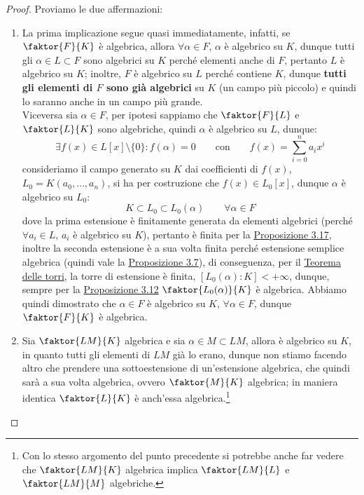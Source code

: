 \documentclass[11pt]{scrartcl}
\begin{document}
\begin{proof}
    Proviamo le due affermazioni:
    \begin{enumerate}[(1)]
        \item La prima implicazione segue quasi immediatamente, infatti, se $\faktor{F}{K}$ è algebrica, allora $\forall \alpha \in F$, $\alpha$ è algebrico su $K$,
            dunque tutti gli $\alpha \in L \subset F$ sono algebrici su $K$ perché elementi anche di $F$, pertanto $L$ è algebrico su $K$; inoltre, $F$ è algebrico su $L$ perché
            contiene $K$, dunque \textbf{tutti gli elementi di $F$ sono già algebrici} su $K$ (un campo più piccolo) e quindi lo saranno anche in un campo più grande.\\
            Viceversa sia $\alpha \in F$, per ipotesi sappiamo che $\faktor{F}{L}$ e $\faktor{L}{K}$ sono algebriche, quindi $\alpha$ è algebrico su $L$, dunque:
            \[ \exists f(x) \in L[x]\setminus\{0\} : f(\alpha) = 0 \qquad \text{con} \qquad f(x) = \sum_{i=0}^n a_ix^i
                \]
            consideriamo il campo generato su $K$ dai coefficienti di $f(x)$, $L_0=K(a_0,\ldots,a_n)$, si ha per costruzione che $f(x) \in L_0[x]$, dunque $\alpha$ è algebrico su $L_0$:
            \[ K \subset L_0 \subset L_0(\alpha) \qquad \forall \alpha \in F
                \]
            dove la prima estensione è finitamente generata da elementi algebrici (perché $\forall a_i \in L$, $a_i$ è algebrico su $K$), pertanto è finita per la \hyperref[3.17]{Proposizione 3.17}, inoltre la seconda 
            estensione è a sua volta finita perché estensione semplice algebrica (quindi vale la \hyperref[3.7]{Proposizione 3.7}), di conseguenza, per il \hyperref[torri]{Teorema delle torri}, la torre di estensione è finita,
            $[L_0(\alpha) : K] < +\infty$, dunque, sempre per la \hyperref[3.12]{Proposizione 3.12} $\faktor{L_0(\alpha)}{K}$ è algebrica. Abbiamo quindi dimostrato che $\alpha \in F$ è algebrico su $K$, $\forall \alpha \in F$,
            dunque $\faktor{F}{K}$ è algebrica.
        \item Sia $\faktor{LM}{K}$ algebrica e sia $\alpha \in M \subset LM$, allora è algebrico su $K$, in quanto tutti gli elementi di $LM$ già lo erano, dunque non stiamo facendo altro che prendere una sottoestensione di un'estensione algebrica, che quindi 
        sarà a sua volta algebrica, ovvero $\faktor{M}{K}$ algebrica; in maniera identica $\faktor{L}{K}$ è anch'essa algebrica.\footnote{Con lo stesso argomento del punto precedente si potrebbe anche far vedere che $\displaystyle\faktor{LM}{K}$ algebrica implica $\displaystyle\faktor{LM}{L}$ e $\displaystyle\faktor{LM}{M}$ algebriche.}\\

\end{enumerate}
\end{proof}
\end{document}
